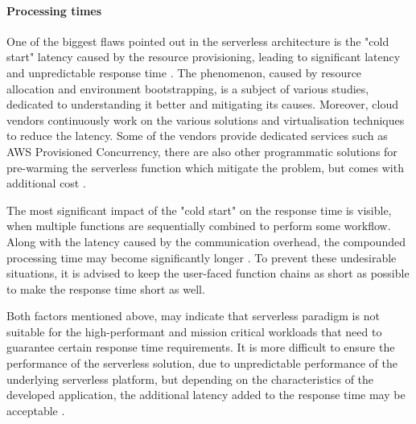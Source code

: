 
\paragraph{Processing times} \label{chapter:serverless-suitability-processing-time}
 
One of the biggest flaws pointed out in the serverless architecture is the "cold start" latency caused by the resource provisioning, leading to significant latency and unpredictable response time \cite{BerkeleyServerless}.
The phenomenon, caused by resource allocation and environment bootstrapping, is a subject of various studies, dedicated to understanding it better and mitigating its causes. Moreover, cloud vendors continuously work on the various solutions and virtualisation techniques to reduce the latency. Some of the vendors provide dedicated services such as AWS Provisioned Concurrency, there are also other programmatic solutions for pre-warming the serverless function which mitigate the problem, but comes with additional cost \cite{MartinFowlerServerless}.

The most significant impact of the "cold start" on the response time is visible, when multiple functions are sequentially combined to perform some workflow. Along with the latency caused by the communication overhead, the compounded processing time may become significantly longer \cite{EvaluationOfServerlessApplicationProgrammingModel}.
To prevent these undesirable situations, it is advised to keep the user-faced function chains as short as possible to make the response time short as well.

Both factors mentioned above, may indicate that serverless paradigm is not suitable for the high-performant and mission critical workloads that need to guarantee certain response time requirements.
It is more difficult to ensure the performance of the serverless solution, due to unpredictable performance of the underlying serverless platform, but depending on the characteristics of the developed application, the additional latency added to the response time may be acceptable \cite{LeveragingServerlessCloudComputingArchitectures}.

